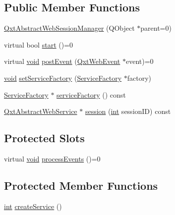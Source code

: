 \subsection*{Public Member Functions}
\begin{DoxyCompactItemize}
\item 
\hyperlink{class_qxt_abstract_web_session_manager_ad8b875265f32a81bc2b3b2af3c24f0d8}{Qxt\-Abstract\-Web\-Session\-Manager} (Q\-Object $\ast$parent=0)
\item 
virtual bool \hyperlink{class_qxt_abstract_web_session_manager_a7073788d4579dea02455bab7fcd45aff}{start} ()=0
\item 
virtual \hyperlink{group___u_a_v_objects_plugin_ga444cf2ff3f0ecbe028adce838d373f5c}{void} \hyperlink{class_qxt_abstract_web_session_manager_a39940ff7c93e5694b979a494b9516f3c}{post\-Event} (\hyperlink{class_qxt_web_event}{Qxt\-Web\-Event} $\ast$event)=0
\item 
\hyperlink{group___u_a_v_objects_plugin_ga444cf2ff3f0ecbe028adce838d373f5c}{void} \hyperlink{class_qxt_abstract_web_session_manager_ab59cd674e389d9a1322a1772a2659012}{set\-Service\-Factory} (\hyperlink{class_qxt_abstract_web_session_manager_a7f507ee9b5b2c24ba2400258fa1a5f81}{Service\-Factory} $\ast$factory)
\item 
\hyperlink{class_qxt_abstract_web_session_manager_a7f507ee9b5b2c24ba2400258fa1a5f81}{Service\-Factory} $\ast$ \hyperlink{class_qxt_abstract_web_session_manager_aa8ce3b712f665b03313a57c015b670fa}{service\-Factory} () const 
\item 
\hyperlink{class_qxt_abstract_web_service}{Qxt\-Abstract\-Web\-Service} $\ast$ \hyperlink{class_qxt_abstract_web_session_manager_a1474f40e016fdab2d0e5d1d70c632104}{session} (\hyperlink{ioapi_8h_a787fa3cf048117ba7123753c1e74fcd6}{int} session\-I\-D) const 
\end{DoxyCompactItemize}
\subsection*{Protected Slots}
\begin{DoxyCompactItemize}
\item 
virtual \hyperlink{group___u_a_v_objects_plugin_ga444cf2ff3f0ecbe028adce838d373f5c}{void} \hyperlink{class_qxt_abstract_web_session_manager_a75fdfab7ef3652d726f7506a6785e3ee}{process\-Events} ()=0
\end{DoxyCompactItemize}
\subsection*{Protected Member Functions}
\begin{DoxyCompactItemize}
\item 
\hyperlink{ioapi_8h_a787fa3cf048117ba7123753c1e74fcd6}{int} \hyperlink{class_qxt_abstract_web_session_manager_a1d426f4d98a80c7150caccd2a06a80f7}{create\-Service} ()
\end{DoxyCompactItemize}


